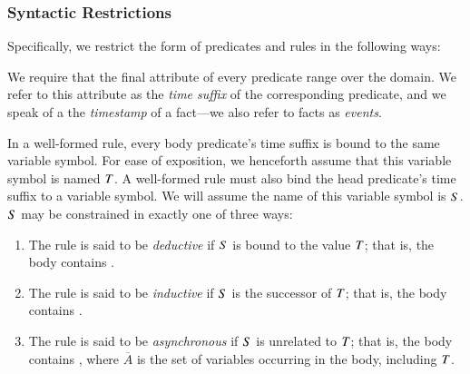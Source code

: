 \subsubsection{Syntactic Restrictions}
\label{sec:syntaxrestrictions}

Specifically, we restrict the form of predicates and rules in the following ways:

We require that the final attribute of every \lang
predicate range over the  domain.  
We refer to this attribute as the \emph{time suffix} of the corresponding
predicate, and we speak of a the {\em timestamp} of a fact---we also refer to
facts as {\em events}.

%
%
In a well-formed \lang rule, every body predicate's time suffix is bound to the
same variable symbol.  For ease of exposition, we henceforth assume that this
variable symbol is named $\DT$.  A well-formed \lang rule must also bind the
head predicate's time suffix to a variable symbol.  We will assume the name of
this variable symbol is $\DS$.  $\DS$ may be constrained in exactly one of
three ways:

\begin{enumerate}
%
\item The rule is said to be {\em deductive} if $\DS$ is bound to the value
$\DT$; that is, the body contains \dedalus{$\DS$ = $\DT$}.
%
\item The rule is said to be {\em inductive} if $\DS$ is the successor of
$\DT$; that is, the body contains .
%
\item The rule is said to be {\em asynchronous} if $\DS$ is unrelated to $\DT$;
that is, the body contains , where $\overline{A}$ is the set of variables occurring in the body,
including $\DT$.
%
\end{enumerate}

